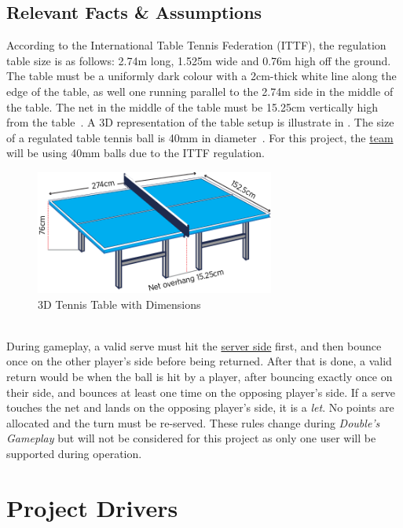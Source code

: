 \documentclass[11pt]{article}
\begin{document}
\subsection{Relevant Facts \& Assumptions}
According to the International Table Tennis Federation (ITTF), the regulation table size is as follows: 2.74m long, 1.525m wide and 0.76m high off the ground. The table must be a uniformly dark colour with a 2cm-thick white line along the edge of the table, as well one running parallel to the 2.74m side in the middle of the table. The net in the middle of the table must be 15.25cm vertically high from the table~\autocite{ITTF}. A 3D representation of the table setup is illustrate in . The size of a regulated table tennis ball is 40mm in diameter~\autocite{ITTF}. For this project, the \hyperref[sec:definitions]{team} will be using 40mm balls due to the ITTF regulation.\\
\begin{figure}[htbp]
   \centering
   \includegraphics[width=0.7\textwidth]{img/table-tennis-dim.png} %
   \caption{3D Tennis Table with Dimensions}
   \label{fig:table-tennis-dim}
\end{figure} \\
During gameplay, a valid serve must hit the \hyperref[sec:definitions]{server side} first, and then bounce once on the other player's side before being returned. After that is done, a valid return would be when the ball is hit by a player, after bouncing exactly once on their side, and bounces at least one time on the opposing player's side. If a serve touches the net and lands on the opposing player's side, it is a \textit{let}. No points are allocated and the turn must be re-served. These rules change during \textit{Double's Gameplay} but will not be considered for this project as only one user will be supported during operation.

\section{Project Drivers}
\end{document}
